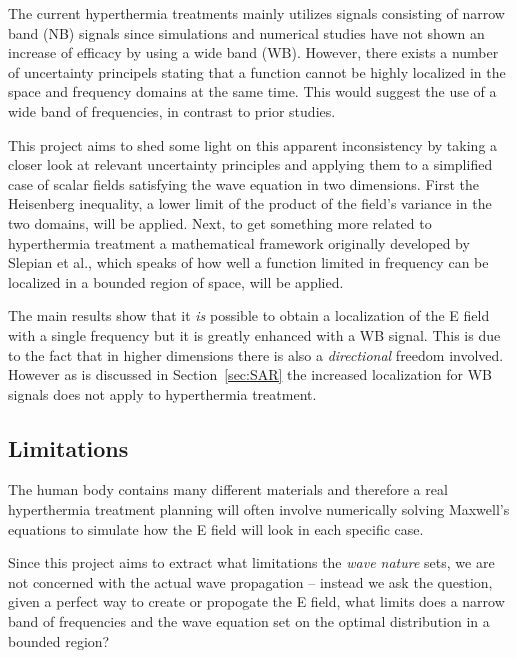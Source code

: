\documentclass[11pt,a4paper, 
swedish,english %
]{article}
\begin{document}
The current hyperthermia treatments mainly utilizes signals consisting of narrow band (NB) signals since simulations and numerical studies have not shown an increase of efficacy by using a wide band (WB). 
However, there exists a number of uncertainty principels stating that a function cannot be highly localized in the space and frequency domains at the same time. This would suggest the use of a wide band of frequencies, in contrast to prior studies.

This project aims to shed some light on this apparent inconsistency by taking a closer look at relevant uncertainty principles and applying them to a simplified case of scalar fields satisfying the wave equation in two dimensions.
First the Heisenberg inequality, a lower limit of the product of the field's variance in the two domains, will be applied.
Next, to get something more related to hyperthermia treatment a mathematical framework originally developed by Slepian et al., which speaks of how well a function limited in frequency can be localized in a bounded region of space, will be applied.

The main results show that it \emph{is} possible to obtain a localization of the E field with a single frequency but it is greatly enhanced with a WB signal. This is due to the fact that in higher dimensions there is also a \emph{directional} freedom involved. However as is discussed in Section~\ref{sec:SAR} the increased localization for WB signals does not apply to hyperthermia treatment. 



\subsection{Limitations}
The human body contains many different materials and therefore a real hyperthermia treatment planning will often involve numerically solving Maxwell's equations to simulate how the E field will look in each specific case.

Since this project aims to extract what limitations the \emph{wave nature} sets, we are not concerned with the actual wave propagation -- instead we ask the question, given a perfect way to create or propogate the E field, what limits does a narrow band of frequencies and the wave equation set on the optimal distribution in a bounded region?
\end{document}
